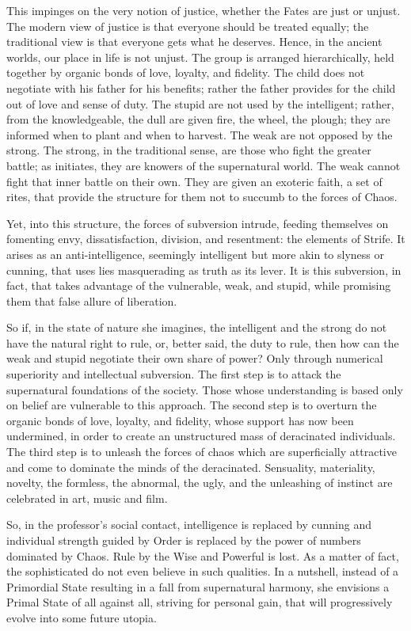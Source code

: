 This impinges on the very notion of justice, whether the Fates are just or unjust. The modern view of justice is that everyone should be treated equally; the traditional view is that everyone gets what he deserves. Hence, in the ancient worlds, our place in life is not unjust. The group is arranged hierarchically, held together by organic bonds of love, loyalty, and fidelity. The child does not negotiate with his father for his benefits; rather the father provides for the child out of love and sense of duty. The stupid are not used by the intelligent; rather, from the knowledgeable, the dull are given fire, the wheel, the plough; they are informed when to plant and when to harvest. The weak are not opposed by the strong. The strong, in the traditional sense, are those who fight the greater battle; as initiates, they are knowers of the supernatural world. The weak cannot fight that inner battle on their own. They are given an exoteric faith, a set of rites, that provide the structure for them not to succumb to the forces of Chaos.

Yet, into this structure, the forces of subversion intrude, feeding themselves on fomenting envy, dissatisfaction, division, and resentment: the elements of Strife. It arises as an anti-intelligence, seemingly intelligent but more akin to slyness or cunning, that uses lies masquerading as truth as its lever. It is this subversion, in fact, that takes advantage of the vulnerable, weak, and stupid, while promising them that false allure of liberation.

So if, in the state of nature she imagines, the intelligent and the strong do not have the natural right to rule, or, better said, the duty to rule, then how can the weak and stupid negotiate their own share of power? Only through numerical superiority and intellectual subversion. The first step is to attack the supernatural foundations of the society. Those whose understanding is based only on belief are vulnerable to this approach. The second step is to overturn the organic bonds of love, loyalty, and fidelity, whose support has now been undermined, in order to create an unstructured mass of deracinated individuals. The third step is to unleash the forces of chaos which are superficially attractive and come to dominate the minds of the deracinated. Sensuality, materiality, novelty, the formless, the abnormal, the ugly, and the unleashing of instinct are celebrated in art, music and film.

So, in the professor's social contact, intelligence is replaced by cunning and individual strength guided by Order is replaced by the power of numbers dominated by Chaos. Rule by the Wise and Powerful is lost. As a matter of fact, the sophisticated do not even believe in such qualities. In a nutshell, instead of a Primordial State resulting in a fall from supernatural harmony, she envisions a Primal State of all against all, striving for personal gain, that will progressively evolve into some future utopia.


